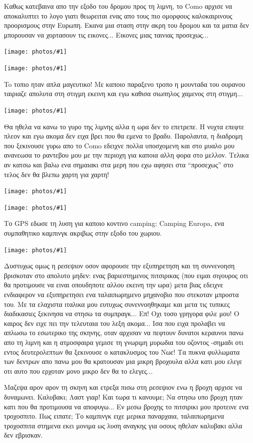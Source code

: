 \documentclass[11pt, letterpaper]{book}
\newcommand\photo[1]{\begin{center}\noindent\texttt{[image: photos/\#1]}\end{center}}
\begin{document}
Καθως κατεβαινα απο την εξοδο του δρομου προς τη λιμνη, το Como αρχισε να αποκαλυπτει το λογο γιατι θεωρειται ενας απο τους πιο ομορφους καλοκαιρινους προορισμους στην Ευρωπη.
Εκανα μια σταση στην ακρη του δρομου και τα ματια δεν μπορουσαν να χορτασουν τις εικονες...
Εικονες μιας ταινιας προσεχως...

\photo{12.jpg}
\photo{13.jpg}

To τοπιο ηταν απλα μαγευτικο! Με καποιο παραξενο τροπο η μουνταδα του ουρανου ταιριαζε απολυτα στη στιγμη εκεινη και εγω καθισα σιωπηλος χαμενος στη στιγμη...

\photo{14.jpg}

Θα ηθελα να κανω το γυρο της λιμνης αλλα η ωρα δεν το επετρεπε. Η νυχτα επεφτε πλεον και εγω ακομα δεν ειχα βρει που θα εμενα το βραδυ. Παρολαυτα, η διαδρομη που ξεκινουσε γυρω απο το Como εδειχνε πολλα υποσχομενη και στο μυαλο μου ανανεωσα το ραντεβου μου με την περιοχη για καποια αλλη φορα στο μελλον. Τελικα αν κατσω και βαλω ενα σημαιακι στα μερη που εχω αφησει στα ``προσεχως'' στο τελος δεν θα βλεπω χαρτη για χαρτη!

\photo{15.jpg}
\photo{16.jpg}

Το GPS εδωσε τη λυση για καποιο κοντινο camping: Camping Europa, ενα συμπαθητικο καμπινγκ ακριβως στην εξοδο του χωριου.

\photo{17.jpg}

Δυστυχως ομως η ρεσεψιον οσον αφορουσε την εξυπηρετηση και τη συννενοηση βρισκοταν στο απολυτο μηδεν: ενας βαριεστημενος πιτσιρικας (που ειμαι σιγουρος οτι θα προτιμουσε να ειναι οπουδηποτε αλλου εκεινη την ωρα) μετα βιας εδειχνε ενδιαφερον να εξυπηρετησει ενα ταλαιπωρημενο μηχανοβιο που στεκοταν μπροστα του.
Με τα ελαχιστα ιταλικα μου ευτυχως συνεννοηθηκαμε και μετα τις τυπικες διαδικασιες ξεκινησα να στησω τα συμπραγκ... Επ! Οχι τοσο γρηγορα φιλε μου! Ο καιρος δεν ειχε πει την τελευταια του λεξη ακομα...
Ισα που ειχα προλαβει να απλωσω το εσωτερικο της σκηνης, οταν αρχισαν να πεφτουν δυνατοι κεραυνοι πανω απο τη λιμνη και η ατμοσφαιρα γεμισε τη γνωριμη μυρωδια του οζοντος -σημαδι οτι εντος δευτερολεπτων θα ξεκινουσε ο κατακλυσμος του Νωε!
Τα πυκνα φυλλωματα των δεντρων απο πανω μου θα κρατουσαν μια μικρη βροχουλα αλλα κατι μου ελεγε οτι αυτο που ερχοταν μονο μικρο δεν θα το ελεγες... 

Μαζεψα αρον αρον τη σκηνη και ετρεξα πισω στη ρεσεψιον ενω η βροχη αρχισε να δυναμωνει. 
Καλυβακι; Λαστ γιαρ! Και τωρα τι κανουμε; Να στησω υπο βροχη ηταν κατι που θα προτιμουσα να αποφυγω...
Εν μεσω βροχης το πιτσιρικι μου προτεινε ενα τροχοσπιτο. Πως ειπατε; 
Το καμπινγκ ειχε μερικα παναρχαια, ταλαιπωρημενα τροχοσπιτα στημενα εκει μονιμα ως λυση αναγκης για οσους ηθελαν καλυβακι αλλα δεν εβρισκαν.
\end{document}
